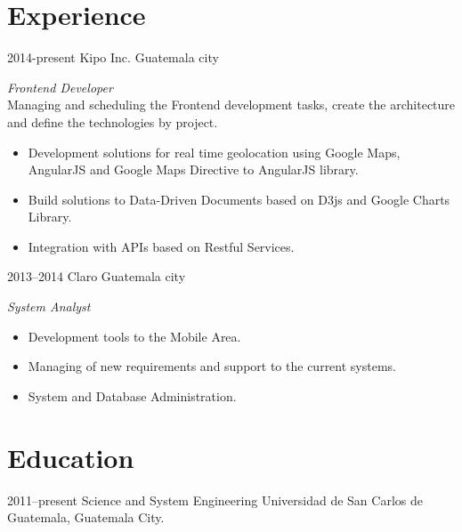 \documentclass[]{friggeri-cv} %
\begin{document}
\section{Experience}
\begin{entrylist}
\entry
	{2014-present}
	{Kipo Inc.}
	{Guatemala city}
	{\emph{Frontend Developer} \\
	Managing and scheduling the Frontend development tasks, create the architecture and define the technologies by project.
	\begin{itemize}
		\item Development solutions for real time geolocation using Google Maps, AngularJS and Google Maps Directive to AngularJS library.
		\item Build solutions to Data-Driven Documents based on D3js and Google Charts Library.
		\item Integration with APIs based on Restful Services.
	\end{itemize}
	
	}
	
\entry
	{2013--2014}
	{Claro}
	{Guatemala city}
	{\emph{System Analyst} \\
	
	\begin{itemize}
		\item Development tools to the Mobile Area.
		\item Managing of new requirements and support to the current systems.
		\item System and Database Administration.
	\end{itemize}
	
	}



\end{entrylist}


\section{Education}

\begin{entrylist}
\entry
{2011--present}
{Science and System Engineering}
{Universidad de San Carlos de Guatemala, Guatemala City.}
{}
\end{entrylist}
\end{document}
